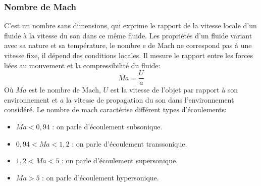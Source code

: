 \documentclass[10pt,a4paper]{article}
\begin{document}
\subsubsection{Nombre de Mach\cite{nbmach}}
C'est un nombre sans dimensions, qui exprime le rapport de la vitesse locale d'un fluide à la vitesse du son dans ce même fluide. Les propriétés d'un fluide variant avec sa nature et sa température, le nombre e de Mach ne correspond pas à une vitesse fixe, il dépend des conditions locales. Il mesure le rapport entre les forces liées au mouvement et la compressibilité du fluide:
\begin{equation}
Ma = \frac{U}{a}
\end{equation}
Où $Ma$ est le nombre de Mach, $U$ est la vitesse de l'objet par rapport à son environnement et $a$ la vitesse de propagation du son\cite{vitesseson} dans l'environnement considéré. Le nombre de mach caractérise différent types d'écoulements:
\begin{itemize}
\item $Ma < 0,94$ : on parle d'écoulement subsonique.
\item $ 0,94 < Ma < 1,2$ : on parle d'écoulement transsonique.
\item $1,2 < Ma < 5$ : on parle d'écoulement supersonique.
\item $Ma > 5$ : on parle d'écoulement hypersonique.
\end{itemize}
\end{document}
